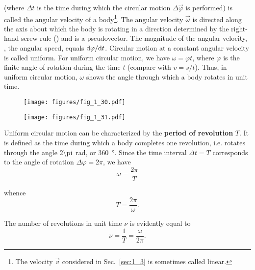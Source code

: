 \noindent
(where $\Delta t$ is the time during which the circular motion $\Delta\vec{\varphi}$ is performed) is called the angular velocity of a body\footnote{The velocity $\vec{v}$ considered in Sec.~\ref{sec:1_3} is sometimes called linear.}. The angular velocity $\vec{\omega}$ is directed along the axis about which the body is rotating in a direction determined by the right-hand screw rule () and is a pseudovector. The magnitude of the angular velocity, \ie, the angular speed, equals $\mathrm{d}\varphi/\mathrm{d} t$. Circular motion at a constant angular velocity is called uniform. For uniform circular motion, we have $\omega=\varphi t$, where $\varphi$ is the finite angle of rotation during the time $t$ (compare with $v=s/t$). Thus, in uniform circular motion, $\omega$ shows the angle through which a body rotates in unit time.

\begin{figure}[t]
	\begin{minipage}[t]{0.5\linewidth}
		\begin{center}
			\texttt{[image: figures/fig\_1\_30.pdf]}
			\caption[]{}
			\label{fig:1_30}
		\end{center}
	\end{minipage}
	\hspace{-0.1cm}
	\begin{minipage}[t]{0.5\linewidth}
		\begin{center}
			\texttt{[image: figures/fig\_1\_31.pdf]}
			\caption[]{}
			\label{fig:1_31}
		\end{center}
	\end{minipage}
	\vspace{-0.5cm}
\end{figure}

Uniform circular motion can be characterized by the \textbf{period of revolution} $T$. It is defined as the time  during which a body completes one revolution, i.e. rotates through the angle \SI{2\pi}{\radian}, or \SI{360}{\degree}. Since the time interval $\Delta t=T$ corresponds to the angle of rotation $\Delta\varphi=2\pi$, we have
\begin{equation}\label{eq:1_94}
\omega = \frac{2\pi}{T}
\end{equation}

\noindent
whence
\begin{equation}\label{eq:1_95}
T = \frac{2\pi}{\omega}.
\end{equation}

The number of revolutions in unit time $\nu$ is evidently equal to
\begin{equation}\label{eq:1_96}
\nu = \frac{1}{T} = \frac{\omega}{2\pi}.
\end{equation}

